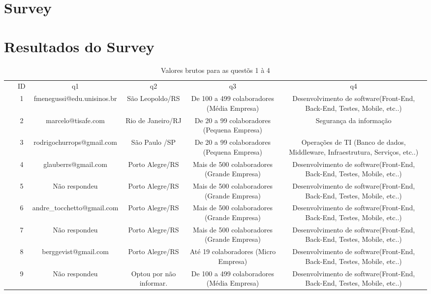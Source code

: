 \documentclass[twoside,english,brazilian]{UNISINOSartigo}
\begin{document}



\appendix

\section{Survey}



\section{Resultados do Survey}

\begin{table}[h]
\tiny
    \caption{Valores brutos para as questõs 1 à 4}
    \begin{tabularx}{\columnwidth}{cccccc}
    \hline
~ & ID & q1 & q2 & q3 & q4 \\
~ & 1 & fmenegussi@edu.unisinos.br & São Leopoldo/RS & De 100 a 499 colaboradores (Média Empresa) & Desenvolvimento de software(Front-End, Back-End, Testes, Mobile, etc..) \\
~ & 2 & marcelo@tisafe.com & Rio de Janeiro/RJ & De 20 a 99 colaboradores (Pequena Empresa) & Segurança da informação \\
~ & 3 & rodrigochurrops@gmail.com & São Paulo /SP & De 20 a 99 colaboradores (Pequena Empresa) & Operações de TI (Banco de dados, Middleware, Infraestrutura, Serviços, etc..) \\
~ & 4 & glauberrs@gmail.com & Porto Alegre/RS & Mais de 500 colaboradores (Grande Empresa) & Desenvolvimento de software(Front-End, Back-End, Testes, Mobile, etc..) \\
~ & 5 & Não respondeu & Porto Alegre/RS & Mais de 500 colaboradores (Grande Empresa) & Desenvolvimento de software(Front-End, Back-End, Testes, Mobile, etc..) \\
~ & 6 & andre_tocchetto@gmail.com & Porto Alegre/RS & Mais de 500 colaboradores (Grande Empresa) & Desenvolvimento de software(Front-End, Back-End, Testes, Mobile, etc..) \\
~ & 7 & Não respondeu & Porto Alegre/RS & Mais de 500 colaboradores (Grande Empresa) & Desenvolvimento de software(Front-End, Back-End, Testes, Mobile, etc..) \\
~ & 8 & berggevist@gmail.com & Porto Alegre/RS & Até 19 colaboradores (Micro Empresa) & Desenvolvimento de software(Front-End, Back-End, Testes, Mobile, etc..) \\
~ & 9 & Não respondeu & Optou por não informar. & De 100 a 499 colaboradores (Média Empresa) & Desenvolvimento de software(Front-End, Back-End, Testes, Mobile, etc..) \\

\end{tabularx}
\end{table}
\end{document}
